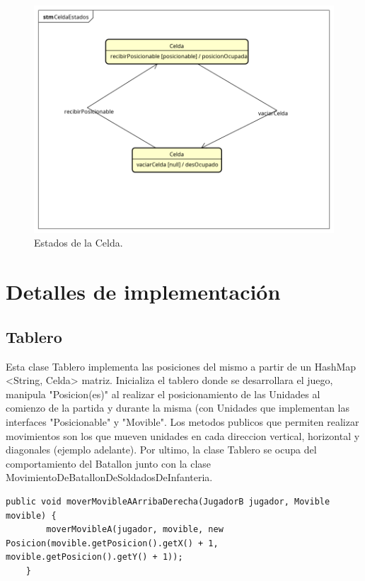 \documentclass[titlepage,a4paper]{article}
\begin{document}
\begin{figure}[H]
\centering
\includegraphics[width=\textwidth]{DiagramasDeSecuencia/CeldaEstadosV2.png}
\caption{\label{fig:seq02q}Estados de la Celda.}
\end{figure}

\section{Detalles de implementación}\label{sec:implementacion}

\subsection{Tablero}
Esta clase Tablero implementa las posiciones del mismo a partir de un HashMap <String, Celda> matriz. Inicializa el tablero donde se desarrollara el juego, manipula "Posicion(es)" al realizar el posicionamiento de las Unidades al comienzo de la partida y durante la misma (con Unidades que implementan las interfaces "Posicionable" y "Movible". Los metodos publicos que permiten realizar movimientos son los que mueven unidades en cada direccion vertical, horizontal y diagonales (ejemplo adelante). Por ultimo, la clase Tablero se ocupa del comportamiento del Batallon junto con la clase MovimientoDeBatallonDeSoldadosDeInfanteria.

\begin{verbatim}
public void moverMovibleAArribaDerecha(JugadorB jugador, Movible movible) {
		moverMovibleA(jugador, movible, new Posicion(movible.getPosicion().getX() + 1, movible.getPosicion().getY() + 1));
	}
\end{verbatim}
\end{document}
